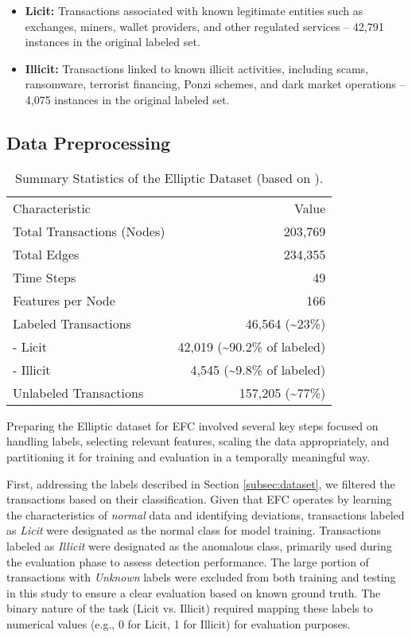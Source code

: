 \documentclass[12pt]{article}
\begin{document}
\begin{itemize}
    \item \textbf{Licit:} Transactions associated with known legitimate entities such as exchanges, miners, wallet providers,
      and other regulated services -- 42,791 instances in the original labeled set.
    \item \textbf{Illicit:} Transactions linked to known illicit activities, including scams, ransomware, terrorist financing,
      Ponzi schemes, and dark market operations -- 4,075 instances in the original labeled set.
\end{itemize}

\subsection{Data Preprocessing} \label{subsec:preprocessing}

\begin{table}[htbp]
  \centering
  \caption{Summary Statistics of the Elliptic Dataset (based on \cite{weber2019antimoneylaunderingbitcoinexperimenting}).}
  \label{tab:dataset_summary}
  \begin{tabular}{lr}
    \hline
    Characteristic        & Value \\
    Total Transactions (Nodes) & 203,769 \\
    Total Edges           & 234,355 \\
    Time Steps            & 49 \\
    Features per Node     & 166 \\
    Labeled Transactions  & 46,564 (\textasciitilde23\%) \\
    \quad - Licit         & 42,019 (\textasciitilde90.2\% of labeled) \\
    \quad - Illicit       & 4,545 (\textasciitilde9.8\% of labeled) \\
    Unlabeled Transactions & 157,205 (\textasciitilde77\%) \\
  \end{tabular}
\end{table}

Preparing the Elliptic dataset for EFC involved several key steps focused on handling labels, selecting relevant features,
scaling the data appropriately, and partitioning it for training and evaluation in a temporally meaningful way.

First, addressing the labels described in Section \ref{subsec:dataset}, we filtered the transactions based on their
classification. Given that EFC operates by learning the characteristics of \textit{normal} data and identifying deviations,
transactions labeled as \textit{Licit} were designated as the normal class for model training. Transactions labeled as \textit{Illicit}
were designated as the anomalous class, primarily used during the evaluation phase to assess detection performance. The
large portion of transactions with \textit{Unknown} labels were excluded from both training and testing in this study to ensure
a clear evaluation based on known ground truth. The binary nature of the task (Licit vs. Illicit) required mapping these
labels to numerical values (e.g., 0 for Licit, 1 for Illicit) for evaluation purposes.
\end{document}
